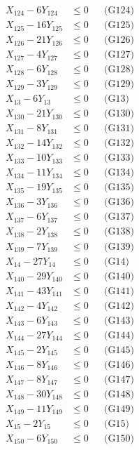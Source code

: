 \documentclass[a4paper,10pt]{article}
\begin{document}
{\begin{align}
X_{124} - 6Y_{124} &\leq 0 && \text{(G124)} \\
X_{125} - 16Y_{125} &\leq 0 && \text{(G125)} \\
X_{126} - 21Y_{126} &\leq 0 && \text{(G126)} \\
X_{127} - 4Y_{127} &\leq 0 && \text{(G127)} \\
X_{128} - 6Y_{128} &\leq 0 && \text{(G128)} \\
X_{129} - 3Y_{129} &\leq 0 && \text{(G129)} \\
X_{13} - 6Y_{13} &\leq 0 && \text{(G13)} \\
X_{130} - 21Y_{130} &\leq 0 && \text{(G130)} \\
X_{131} - 8Y_{131} &\leq 0 && \text{(G131)} \\
X_{132} - 14Y_{132} &\leq 0 && \text{(G132)} \\
X_{133} - 10Y_{133} &\leq 0 && \text{(G133)} \\
\allowbreak
X_{134} - 11Y_{134} &\leq 0 && \text{(G134)} \\
X_{135} - 19Y_{135} &\leq 0 && \text{(G135)} \\
X_{136} - 3Y_{136} &\leq 0 && \text{(G136)} \\
X_{137} - 6Y_{137} &\leq 0 && \text{(G137)} \\
X_{138} - 2Y_{138} &\leq 0 && \text{(G138)} \\
X_{139} - 7Y_{139} &\leq 0 && \text{(G139)} \\
X_{14} - 27Y_{14} &\leq 0 && \text{(G14)} \\
X_{140} - 29Y_{140} &\leq 0 && \text{(G140)} \\
X_{141} - 43Y_{141} &\leq 0 && \text{(G141)} \\
X_{142} - 4Y_{142} &\leq 0 && \text{(G142)} \\
X_{143} - 6Y_{143} &\leq 0 && \text{(G143)} \\
X_{144} - 27Y_{144} &\leq 0 && \text{(G144)} \\
X_{145} - 2Y_{145} &\leq 0 && \text{(G145)} \\
X_{146} - 8Y_{146} &\leq 0 && \text{(G146)} \\
X_{147} - 8Y_{147} &\leq 0 && \text{(G147)} \\
X_{148} - 30Y_{148} &\leq 0 && \text{(G148)} \\
X_{149} - 11Y_{149} &\leq 0 && \text{(G149)} \\
X_{15} - 2Y_{15} &\leq 0 && \text{(G15)} \\
X_{150} - 6Y_{150} &\leq 0 && \text{(G150)} \\

\end{align}}
\end{document}
